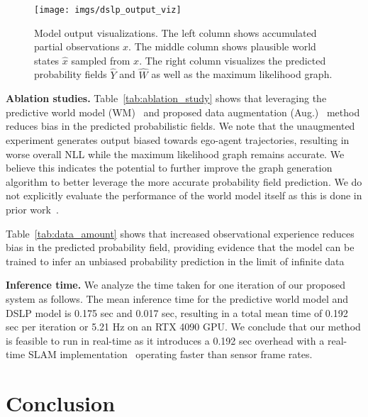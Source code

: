 \documentclass[letterpaper, 10 pt, conference]{ieeeconf}
\begin{document}
\begin{figure} \centering
\texttt{[image: imgs/dslp\_output\_viz]}
\vspace{-8mm}
\caption{Model output visualizations. The left column shows accumulated partial observations $x$. The middle column shows plausible world states $\hat{x}$ sampled from $x$. The right column visualizes the predicted probability fields $\hat{Y}$ and $\hat{W}$ as well as the maximum likelihood graph.}
\label{fig:output_viz}
\vspace{-6mm}
\end{figure}

\textbf{Ablation studies.}
Table~\ref{tab:ablation_study} shows that leveraging the predictive world model (WM)~\cite{karlsson2023pred_wm} and 
proposed data augmentation (Aug.)~\cite{karlsson2020dsla} method reduces bias in the predicted probabilistic fields. We note that the unaugmented experiment generates output biased towards ego-agent trajectories, resulting in worse overall NLL while the maximum likelihood graph remains accurate. We believe this indicates the potential to further improve the graph generation algorithm to better leverage the more accurate probability field prediction. We do not explicitly evaluate the performance of the world model itself as this is done in prior work~\cite{karlsson2023pred_wm}.

Table~\ref{tab:data_amount} shows that increased observational experience reduces bias in the predicted probability field, providing evidence that the model can be trained to infer an unbiased probability prediction in the limit of infinite data




\textbf{Inference time.} We analyze the time taken for one iteration of our proposed system as follows. The mean inference time for the predictive world model and DSLP model is 0.175 sec and 0.017 sec, resulting in a total mean time of 0.192 sec per iteration or 5.21 Hz on an RTX 4090 GPU. We conclude that our method is feasible to run in real-time as it introduces a 0.192 sec overhead with a real-time SLAM implementation~\cite{vizzo2022kiss-icp} operating faster than sensor frame rates.


\section{Conclusion}
\end{document}
